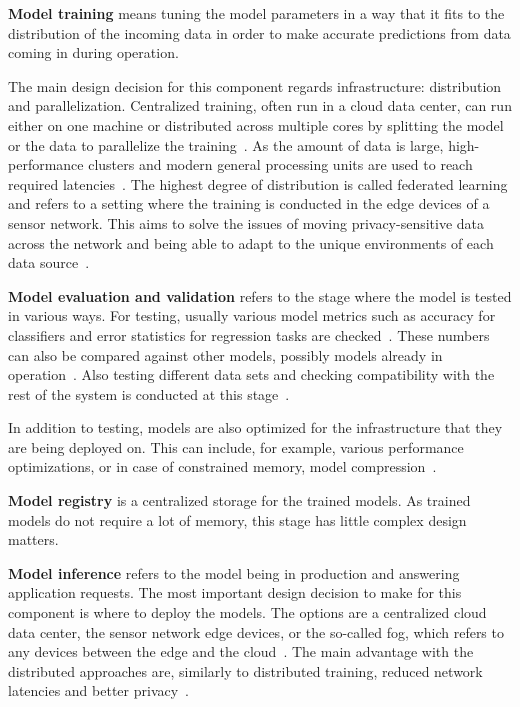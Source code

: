 \textbf{Model training} means tuning the model parameters in a way that it fits to the distribution of the incoming data in order to make accurate predictions from data coming in during operation.

The main design decision for this component regards infrastructure: distribution and parallelization. Centralized training, often run in a cloud data center, can run either on one machine or distributed across multiple cores by splitting the model or the data to parallelize the training~\cite{ben-nunDemystifyingParallelDistributed2019}. As the amount of data is large, high-performance clusters and modern general processing units are used to reach required latencies~\cite{iotsurvey}. The highest degree of distribution is called federated learning and refers to a setting where the training is conducted in the edge devices of a sensor network. This aims to solve the issues of moving privacy-sensitive data across the network and being able to adapt to the unique environments of each data source~\cite{iotsurvey}.

\textbf{Model evaluation and validation} refers to the stage where the model is tested in various ways. For testing, usually various model metrics such as accuracy for classifiers and error statistics for regression tasks are checked~\cite{iotsurvey}. These numbers can also be compared against other models, possibly models already in operation~\cite{googlemlops}. Also testing different data sets and checking compatibility with the rest of the system is conducted at this stage~\cite{googlemlops}.

In addition to testing, models are also optimized for the infrastructure that they are being deployed on. This can include, for example, various performance optimizations, or in case of constrained memory, model compression~\cite{iotsurvey}.

\textbf{Model registry} is a centralized storage for the trained models. As trained models do not require a lot of memory, this stage has little complex design matters.

\textbf{Model inference} refers to the model being in production and answering application requests.
The most important design decision to make for this component is where to deploy the models. The options are a centralized cloud data center, the sensor network edge devices, or the so-called fog, which refers to any devices between the edge and the cloud~\cite{fogsurvey}. The main advantage with the distributed approaches are, similarly to distributed training, reduced network latencies and better privacy~\cite{szeEfficientProcessingDeep2017}.

